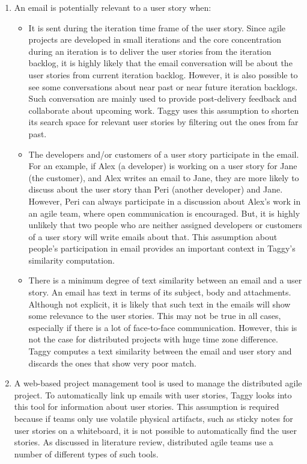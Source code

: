 \begin{enumerate}
	\item An email is potentially relevant to a user story when:
		\begin{itemize}
			\item It is sent during the iteration time frame of the user story. Since agile projects are developed in small iterations and the core concentration during an iteration is to deliver the user stories from the iteration backlog, it is highly likely that the email conversation will be about the user stories from current iteration backlog. However, it is also possible to see some conversations about near past or near future iteration backlogs. Such conversation are mainly used to provide post-delivery feedback and collaborate about upcoming work. Taggy uses this assumption to shorten its search space for relevant user stories by filtering out the ones from far past.
			
			\item The developers and/or customers of a user story participate in the email. For an example, if Alex (a developer) is working on a user story for Jane (the customer), and Alex writes an email to Jane, they are more likely to discuss about the user story than Peri (another developer) and Jane. However, Peri can always participate in a discussion about Alex's work in an agile team, where open communication is encouraged. But, it is highly unlikely that two people who are neither assigned developers or customers of a user story will write emails about that. This assumption about people's participation in email provides an important context in Taggy's similarity computation.
			
			\item There is a minimum degree of text similarity between an email and a user story. An email has text in terms of its subject, body and attachments. Although not explicit, it is likely that such text in the emails will show some relevance to the user stories. This may not be true in all cases, especially if there is a lot of face-to-face communication. However, this is not the case for distributed projects with huge time zone difference. Taggy computes a text similarity between the email and user story and discards the ones that show very poor match.
		\end{itemize}
	 \item A web-based project management tool is used to manage the distributed agile project. To automatically link up emails with user stories, Taggy looks into this tool for information about user stories. This assumption is required because if teams only use volatile physical artifacts, such as sticky notes for user stories on a whiteboard, it is not possible to automatically find the user stories. As discussed in literature review, distributed agile teams use a number of different types of such tools.
	

\end{enumerate}
